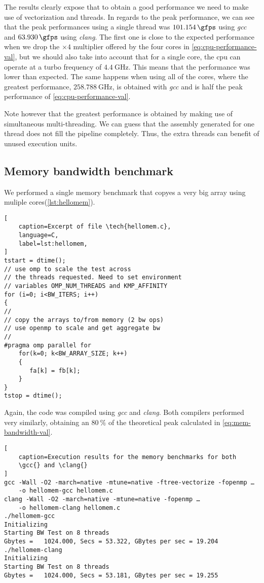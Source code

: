 \documentclass[
    12pt, %
]{fphw}
\newcommand{\tech}{\texttt}
\newcommand{\gcc}{\textit{gcc}}
\newcommand{\clang}{\textit{clang}}
\begin{document}
\noindent
The results clearly expose that to obtain a good performance we need to make use of
vectorization and threads.
In regards to the peak performance, we can see
that the peak performances using a single thread was
$\SI{101.154}{\gfps}$ using \gcc{} and
$\SI{63.930}{\gfps}$ using \clang{}.
The first one is close to the expected performance when we drop
the $\times 4$ multiplier offered by the four cores in \cref{eq:cpu-performance-val},
but we should also take into account that for a single core,
the cpu can operate at a turbo frequency of $\SI{4.4}{\GHz}$.
This means that the performance was lower than expected.
The same happens when using all of the cores,
where the greatest performance, $\SI{258.788}{\GHz}$,
is obtained with \gcc{} and is half the peak performance of
\cref{eq:cpu-performance-val}.

    Note however that the greatest performance is obtained by
making use of simultaneous multi-threading.
We can guess that the assembly generated for one thread
does not fill the pipeline completely.
Thus, the extra threads can benefit of unused execution units.

\subsection{Memory bandwidth benchmark}

    We performed a single memory benchmark that copyes a very big array
using muliple cores(\cref{lst:hellomem}).

\begin{lstlisting}[
    caption=Excerpt of file \tech{hellomem.c},
    language=C,
    label=lst:hellomem,
]
tstart = dtime();
// use omp to scale the test across 
// the threads requested. Need to set environment 
// variables OMP_NUM_THREADS and KMP_AFFINITY
for (i=0; i<BW_ITERS; i++)
{
//
// copy the arrays to/from memory (2 bw ops)
// use openmp to scale and get aggregate bw 
//
#pragma omp parallel for
    for(k=0; k<BW_ARRAY_SIZE; k++)  
    {
       fa[k] = fb[k];
    }
}
tstop = dtime();
\end{lstlisting}

\noindent
Again, the code was compiled using \gcc{} and \clang{}.
Both compilers performed very similarly, obtaining an $\SI{80}{\percent}$
of the theoretical peak calculated in \cref{eq:mem-bandwidth-val}.

\begin{lstlisting}[
    caption=Execution results for the memory benchmarks for both
    \gcc{} and \clang{}
]
gcc -Wall -O2 -march=native -mtune=native -ftree-vectorize -fopenmp …
    -o hellomem-gcc hellomem.c
clang -Wall -O2 -march=native -mtune=native -fopenmp …
    -o hellomem-clang hellomem.c
./hellomem-gcc 
Initializing
Starting BW Test on 8 threads
Gbytes =   1024.000, Secs = 53.322, GBytes per sec = 19.204
./hellomem-clang 
Initializing
Starting BW Test on 8 threads
Gbytes =   1024.000, Secs = 53.181, GBytes per sec = 19.255
\end{lstlisting}
\end{document}
